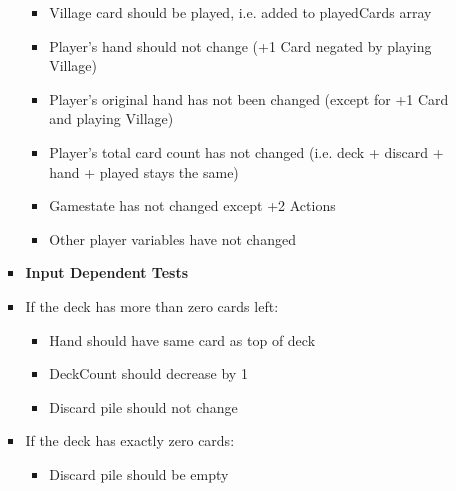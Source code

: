 \documentclass[11pt,letterpaper]{article}
\begin{document}
\begin{enumerate}[label=\Roman*.]
\begin{itemize}[leftmargin=*]
\begin{itemize}[leftmargin=*, label={}]
            \begin{itemize}[leftmargin=*]
              \item Village card should be played, i.e. added to playedCards array
              \item Player's hand should not change (+1 Card negated by playing Village)
              \item Player's original hand has not been changed (except for +1 Card and playing Village)
              \item Player's total card count has not changed (i.e. deck + discard + hand + played stays the same)
              \item Gamestate has not changed except +2 Actions
              \item Other player variables have not changed
            \end{itemize}

          \item \textbf{Input Dependent Tests}
          \item If the deck has more than zero cards left: 
            \begin{itemize}[leftmargin=*]
              \item Hand should have same card as top of deck
              \item DeckCount should decrease by 1
              \item Discard pile should not change
            \end{itemize}
          \item If the deck has exactly zero cards:
            \begin{itemize}[leftmargin=*]
              \item Discard pile should be empty
            \end{itemize}
        \end{itemize}


\end{itemize}
\end{enumerate}
\end{document}
